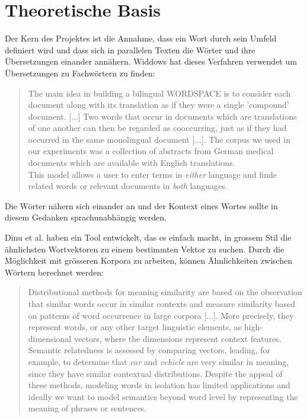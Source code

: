 \documentclass[11pt,twoside,openright]{mpreport}
\begin{document}
\chapter{Theoretische Basis}
\label{cha:theorie}
Der Kern des Projektes ist die Annahme, dass ein Wort durch sein Umfeld definiert wird und dass sich in parallelen Texten die Wörter und ihre Übersetzungen einander annähern. Widdows \citep[S. 190ff.]{geometry} hat dieses Verfahren verwendet um Übersetzungen zu Fachwörtern zu finden:
\begin{quote}
The main idea in building a bilingual WORDSPACE is to consider each document along with its translation as if they were a single 'compound' document. [...] Two words that occur in documents which are translations of one another can then be regarded as cooccurring, just as if they had occurred in the same monolingual document [...]. The corpus we used in our experiments was a collection of abstracts from German medical documents which are available with English translations.\\
This model allows a user to enter terms in \emph{either} language and finde related words or relevant documents in \emph{both} languages.
\end{quote}
Die Wörter nähern sich einander an und der Kontext eines Wortes sollte in diesem Gedanken sprachunabhängig werden.


Dinu et al. \cite{dissect} haben ein Tool entwickelt, das es einfach macht, in grossem Stil die ähnlichsten Wortvektoren zu einem bestimmten Vektor zu suchen. Durch die Möglichkeit mit grösseren Korpora zu arbeiten, können Ähnlichkeiten zwischen Wörtern berechnet werden:
\begin{quote}
Distributional methods for meaning similarity are based on the observation that similar words occur in similar contexts and measure similarity based on patterns of word occurrence in large corpora [...]. More precisely, they represent words, or any other target linguistic elements, as high-dimensional vectors, where the dimensions represent context features.\\
Semantic relatedness is assessed by comparing vectors, leading, for example, to determine that \emph{car} and \emph{vehicle} are very similar in meaning, since they have similar contextual distributions. Despite the appeal of these methods, modeling words in isolation has limited applications and ideally we want to model semantics beyond word level by representing the meaning of phrases or sentences.
\end{quote}
\end{document}

